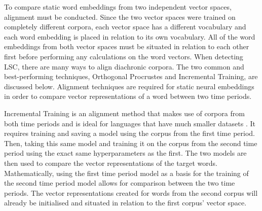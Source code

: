 To compare static word embeddings from two independent vector spaces, alignment must be conducted. Since the two vector spaces were trained on completely different corpora, each vector space has a different vocabulary and each word embedding is placed in relation to its own vocabulary. All of the word embeddings from both vector spaces must be situated in relation to each other first before performing any calculations on the word vectors. When detecting LSC, there are many ways to align diachronic corpora. The two common and best-performing techniques, Orthogonal Procrustes and Incremental Training, are discussed below. Alignment techniques are required for static neural embeddings in order to compare vector representations of a word between two time periods. 

Incremental Training is an alignment method that makes use of corpora from both time periods and is ideal for languages that have much smaller datasets \citep{kim-temporal2014}. It requires training and saving a model using the corpus from the first time period. Then, taking this same model and training it on the corpus from the second time period using the exact same hyperparameters as the first. The two models are then used to compare the vector representations of the target words. Mathematically, using the first time period model as a basis for the training of the second time period model allows for comparison between the two time periods. The vector representations created for words from the second corpus will already be initialised and situated in relation to the first corpus' vector space.

